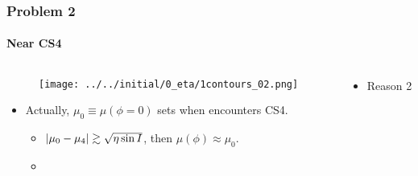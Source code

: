 \documentclass[dvipsnames, 11pt]{beamer}
\DeclarePairedDelimiter\abs{\lvert}{\rvert}
\begin{document}
\begin{frame}
    \frametitle{Problem 2}
    \framesubtitle{Near CS4}

    \begin{columns}
        \begin{column}{0.5\textwidth}
            \begin{figure}[t]
                \centering
                \texttt{[image: ../../initial/0\_eta/1contours\_02.png]}
            \end{figure}

            \begin{itemize}
                \item Actually, $\mu_0 \equiv \mu(\phi = 0)$ sets when
                    encounters CS4.

                \begin{itemize}
                    \item $\abs*{\mu_0 - \mu_4} \gtrsim \sqrt{\eta \sin I}$,
                        then $\mu(\phi) \approx \mu_0$.

                    \item
                \end{itemize}
            \end{itemize}
        \end{column}
        \begin{column}{0.5\textwidth}
            \begin{itemize}
                \item Reason 2
            \end{itemize}
        \end{column}
    \end{columns}
\end{frame}
\end{document}
